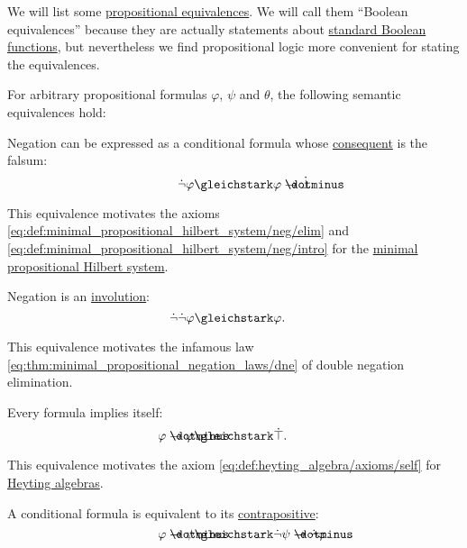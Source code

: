 \begin{proposition}\label{thm:boolean_equivalences}
  We will list some \hyperref[def:propositional_entailment/equivalence]{propositional equivalences}. We will call them \enquote{Boolean equivalences} because they are actually statements about \hyperref[def:standard_boolean_functions]{standard Boolean functions}, but nevertheless we find propositional logic more convenient for stating the equivalences.

  For arbitrary propositional formulas \( \varphi \), \( \psi \) and \( \theta \), the following semantic equivalences hold:
  \begin{thmenum}
     Negation can be expressed as a conditional formula whose \hyperref[def:conditional_formula/consequent]{consequent} is the falsum:
    \begin{equation}\label{eq:thm:boolean_equivalences/negation_bottom}
      \mathllap{\synneg \varphi} \gleichstark \mathrlap{\varphi \synimplies \synbot.}
    \end{equation}

    This equivalence motivates the axioms \eqref{eq:def:minimal_propositional_hilbert_system/neg/elim} and \eqref{eq:def:minimal_propositional_hilbert_system/neg/intro} for the \hyperref[def:minimal_propositional_hilbert_system]{minimal propositional Hilbert system}.

     Negation is an \hyperref[def:involution]{involution}:
    \begin{equation}\label{eq:thm:boolean_equivalences/double_negation}
      \mathllap{\synneg \synneg \varphi} \gleichstark \mathrlap{\varphi.}
    \end{equation}

    This equivalence motivates the infamous law \eqref{eq:thm:minimal_propositional_negation_laws/dne} of double negation elimination.

     Every formula implies itself:
    \begin{equation}\label{eq:thm:boolean_equivalences/self_conditional}
      \mathllap{\varphi \synimplies \varphi} \gleichstark \mathrlap{\syntop.}
    \end{equation}

    This equivalence motivates the axiom \eqref{eq:def:heyting_algebra/axioms/self} for \hyperref[def:heyting_algebra]{Heyting algebras}.

     A conditional formula is equivalent to its \hyperref[def:conditional_formula/contrapositive]{contrapositive}:
    \begin{equation}\label{eq:thm:boolean_equivalences/contrapositive}
      \mathllap{\varphi \synimplies \psi} \gleichstark \mathrlap{\synneg \psi \synimplies \synneg \varphi.}
    \end{equation}


\end{thmenum}
\end{proposition}
